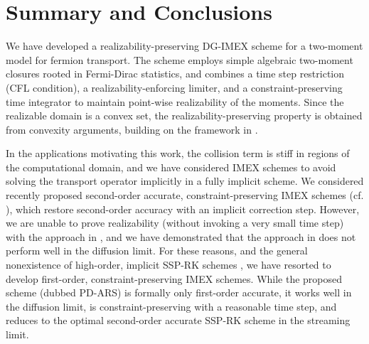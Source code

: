 \section{Summary and Conclusions}
\label{sec:conclusions}

We have developed a realizability-preserving DG-IMEX scheme for a two-moment model for fermion transport.  
The scheme employs simple algebraic two-moment closures rooted in Fermi-Dirac statistics, and combines a time step restriction (CFL condition), a realizability-enforcing limiter, and a constraint-preserving time integrator to maintain point-wise realizability of the moments.  
Since the realizable domain is a convex set, the realizability-preserving property is obtained from convexity arguments, building on the framework in \cite{zhangShu_2010a}.  

In the applications motivating this work, the collision term is stiff in regions of the computational domain, and we have considered IMEX schemes to avoid solving the transport operator implicitly in a fully implicit scheme.  
We considered recently proposed second-order accurate, constraint-preserving IMEX schemes (cf. \cite{chertock_etal_2015,hu_etal_2018}), which restore second-order accuracy with an implicit correction step.  
However, we are unable to prove realizability (without invoking a very small time step) with the approach in \cite{chertock_etal_2015}, and we have demonstrated that the approach in \cite{hu_etal_2018} does not perform well in the diffusion limit.  
For these reasons, and the general nonexistence of high-order, implicit SSP-RK schemes \cite{gottlieb_etal_2001}, we have resorted to develop first-order, constraint-preserving IMEX schemes.  
While the proposed scheme (dubbed PD-ARS) is formally only first-order accurate, it works well in the diffusion limit, is constraint-preserving with a reasonable time step, and reduces to the optimal second-order accurate SSP-RK scheme in the streaming limit.  

